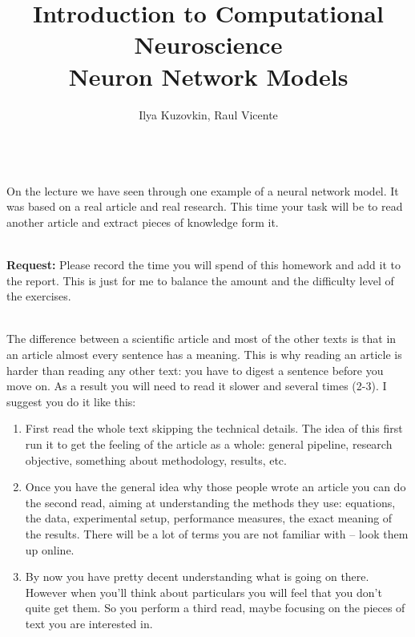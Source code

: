 \documentclass[a4paper,11pt]{article}
\author{\large{Ilya Kuzovkin, Raul Vicente}}
\title{\huge{Introduction to Computational Neuroscience}\\\LARGE{Neuron Network Models}}
\begin{document}
\maketitle


%
%
\ \\
On the lecture we have seen through one example of a neural network model. It was based on a real article and real research. This time your task will be to read another article and extract pieces of knowledge form it. 

\ \\
\textbf{Request:} Please record the time you will spend of this homework and add it to the report. This is just for me to balance the amount and the difficulty level of the exercises.

\ \\
The difference between a scientific article and most of the other texts is that in an article almost every sentence has a meaning. This is why reading an article is harder than reading any other text: you have to digest a sentence before you move on. As a result you will need to read it slower and several times (2-3). I suggest you do it like this:
\begin{enumerate}[label=\alph*)]
	\item First read the whole text skipping the technical details. The idea of this first run it to get the feeling of the article as a whole: general pipeline, research objective, something about methodology, results, etc.
	\item Once you have the general idea why those people wrote an article you can do the second read, aiming at understanding the methods they use: equations, the data, experimental setup, performance measures, the exact meaning of the results. There will be a lot of terms you are not familiar with -- look them up online.
	\item By now you have pretty decent understanding what is going on there. However when you'll think about particulars you will feel that you don't quite get them. So you perform a third read, maybe focusing on the pieces of text you are interested in.
\end{enumerate}
\end{document}
